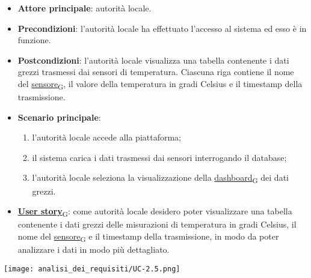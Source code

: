 \newpage
{}
\begin{itemize}
	\item \textbf{Attore principale}: autorità locale.
	\item \textbf{Precondizioni}: l'autorità locale ha effettuato l'accesso al sistema ed esso è in funzione.
	\item \textbf{Postcondizioni}: l'autorità locale visualizza una tabella contenente i dati grezzi trasmessi dai sensori di temperatura.
	      Ciascuna riga contiene il nome del \href{https://7last.github.io/docs/pb/documentazione-interna/glossario\#sensore}{sensore\textsubscript{G}}, il valore della temperatura in gradi Celsius e il timestamp della trasmissione.
	\item \textbf{Scenario principale}:
	      \begin{enumerate}
		      \item l'autorità locale accede alla piattaforma;
		      \item il sistema carica i dati trasmessi dai sensori interrogando il database;
		      \item l'autorità locale seleziona la visualizzazione della \href{https://7last.github.io/docs/pb/documentazione-interna/glossario\#dashboard}{dashboard\textsubscript{G}} dei dati grezzi.
	      \end{enumerate}
	\item \href{https://7last.github.io/docs/pb/documentazione-interna/glossario\#user-story}{\textbf{User story}\textsubscript{G}}:
	      come autorità locale desidero poter visualizzare una tabella contenente i dati grezzi delle misurazioni di temperatura
	      in gradi Celsius, il nome del \href{https://7last.github.io/docs/pb/documentazione-interna/glossario\#sensore}{sensore\textsubscript{G}} e il timestamp della trasmissione, in modo da poter analizzare i dati in modo più dettagliato.
\end{itemize}
\begin{center}
	\texttt{[image: analisi\_dei\_requisiti/UC-2.5.png]}
\end{center}

